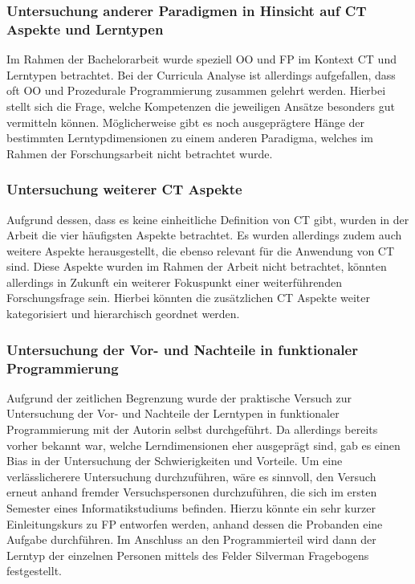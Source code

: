 \subsubsection{Untersuchung anderer Paradigmen in Hinsicht auf CT Aspekte und Lerntypen}
Im Rahmen der Bachelorarbeit wurde speziell OO und FP im Kontext CT und Lerntypen betrachtet. Bei der Curricula Analyse ist allerdings aufgefallen, dass oft OO und Prozedurale Programmierung zusammen gelehrt werden. Hierbei stellt sich die Frage, welche Kompetenzen die jeweiligen Ansätze besonders gut vermitteln können.
Möglicherweise gibt es noch ausgeprägtere Hänge der bestimmten Lerntypdimensionen zu einem anderen Paradigma, welches im Rahmen der Forschungsarbeit nicht betrachtet wurde.

\subsubsection{Untersuchung weiterer CT Aspekte}
Aufgrund dessen, dass es keine einheitliche Definition von CT gibt, wurden in der Arbeit die vier häufigsten Aspekte betrachtet. Es wurden allerdings zudem auch weitere Aspekte herausgestellt, die ebenso relevant für die Anwendung von CT sind. Diese Aspekte wurden im Rahmen der Arbeit nicht betrachtet, könnten allerdings in Zukunft ein weiterer Fokuspunkt einer weiterführenden Forschungsfrage sein. Hierbei könnten die zusätzlichen CT Aspekte weiter kategorisiert und hierarchisch geordnet werden.

\subsubsection{Untersuchung der Vor- und Nachteile in funktionaler Programmierung}\label{sec:empirical}
Aufgrund der zeitlichen Begrenzung wurde der praktische Versuch zur Untersuchung der Vor- und Nachteile der Lerntypen in funktionaler Programmierung mit der Autorin selbst durchgeführt. Da allerdings bereits vorher bekannt war, welche Lerndimensionen eher ausgeprägt sind, gab es einen Bias in der Untersuchung der Schwierigkeiten und Vorteile.
Um eine verlässlicherere Untersuchung durchzuführen, wäre es sinnvoll, den Versuch erneut anhand fremder Versuchspersonen durchzuführen, die sich im ersten Semester eines Informatikstudiums befinden.
Hierzu könnte ein sehr kurzer Einleitungskurs zu FP entworfen werden, anhand dessen die Probanden eine Aufgabe durchführen. Im Anschluss an den Programmierteil wird dann der Lerntyp der einzelnen Personen mittels des Felder Silverman Fragebogens festgestellt.

